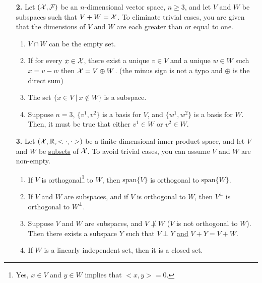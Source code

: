 \documentclass[letterpaper]{article}
\newcommand{\real}{\mathbb R}  %
\newcommand{\spanof}[1]{\textrm{span} \{ #1 \}}
\begin{document}
\begin{enumerate}
\begin{enumerate}
\end{enumerate}

\vspace*{4cm}

\item[{\bf 2.}]  Let $({\cal X}, {\cal F})$ be an $n$-dimensional vector space, $n \ge 3$, and let $V$ and $W$ be subspaces such that $V+W = {\cal X}$. To eliminate trivial cases, you are given that the dimensions of $V$ and $W$ are each greater than or equal to one.
\begin{enumerate}
\setlength{\itemsep}{.15in}
\renewcommand{\labelenumi}{(\alph{enumi})}
\setlength{\itemsep}{.1in}
\item $V\cap W$ can be the empty set.
\item  If for every $x\in {\cal X}$, there exist a unique $v\in V$ and a unique $ w \in W$ such $x=v-w$ then ${\cal X} =V \oplus W$. (the minus sign is not a typo and $\oplus$ is the direct sum)
    \item The set $\{ x \in V~|~ x \not \in W\}$ is a subspace.
    \item Suppose $n=3$, $\{v^1, v^2 \}$ is a basis for $V$, and $\{w^1, w^2 \}$ is a basis for $W$. Then, it must be true that either $v^1 \in W$ or $v^2 \in W$.
\end{enumerate}

\newpage

\item[{\bf 3.}]  Let $({\cal X}, \real, <\cdot, \cdot>)$ be a finite-dimensional inner product space, and let $V$ and $W$ be \underline{subsets} of ${\cal X}$. To avoid trivial cases, you can assume $V$ and $W$ are non-empty.
\begin{enumerate}
\setlength{\itemsep}{.15in}
\renewcommand{\labelenumi}{(\alph{enumi})}
\setlength{\itemsep}{.1in}
\item If $V $ is orthogonal\footnote{Yes, $x\in V$ and $y\in W$ implies that $<x,y>=0.$} to $W$, then $\spanof{V}$ is orthogonal to $\spanof{W}$.
\item If $V$ and $W$ are subspaces, and if $V $ is orthogonal to $W$, then $V^\perp$ is orthogonal to $W^\perp$.
\item Suppose $V$ and $W$ are subspaces, and $V  \not \perp W$ ($V$ is not orthogonal to $W$). Then there exists a subspace $Y$ such that $V \perp Y$ \underline{and} $V+Y = V + W.$
\item If $W$ is a linearly independent set, then it is a closed set.
\end{enumerate}


\end{enumerate}
\end{document}
